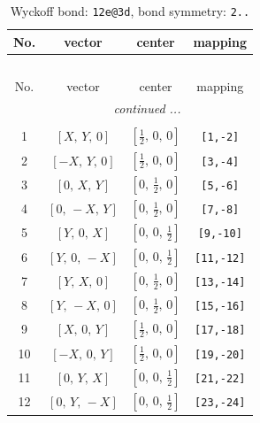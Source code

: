 \documentclass[fleqn,8pt]{jsarticle}
\begin{document}
\renewcommand{\arraystretch}{1.2}
\begin{longtable}{cccc}
\caption{Wyckoff bond: {\tt 12e@3d}, bond symmetry: {\tt 2..}}
 \\
 \hline \hline
No. & vector & center & mapping \\ \hline \endfirsthead

\multicolumn{3}{l}{\tablename\ \thetable{}} \\
 \hline \hline
No. & vector & center & mapping \\ \hline \endhead

 \hline \hline
\multicolumn{3}{r}{\footnotesize\it continued ...} \\ \endfoot

 \hline \hline
\multicolumn{3}{r}{} \\ \endlastfoot

1 & $\left[ X,\, Y,\, 0 \right]$ & $\left[ \frac{1}{2},\, 0,\, 0 \right]$ & {\tt [1,-2]} \\ \hline
2 & $\left[ - X,\, Y,\, 0 \right]$ & $\left[ \frac{1}{2},\, 0,\, 0 \right]$ & {\tt [3,-4]} \\ \hline
3 & $\left[ 0,\, X,\, Y \right]$ & $\left[ 0,\, \frac{1}{2},\, 0 \right]$ & {\tt [5,-6]} \\ \hline
4 & $\left[ 0,\, - X,\, Y \right]$ & $\left[ 0,\, \frac{1}{2},\, 0 \right]$ & {\tt [7,-8]} \\ \hline
5 & $\left[ Y,\, 0,\, X \right]$ & $\left[ 0,\, 0,\, \frac{1}{2} \right]$ & {\tt [9,-10]} \\ \hline
6 & $\left[ Y,\, 0,\, - X \right]$ & $\left[ 0,\, 0,\, \frac{1}{2} \right]$ & {\tt [11,-12]} \\ \hline
7 & $\left[ Y,\, X,\, 0 \right]$ & $\left[ 0,\, \frac{1}{2},\, 0 \right]$ & {\tt [13,-14]} \\ \hline
8 & $\left[ Y,\, - X,\, 0 \right]$ & $\left[ 0,\, \frac{1}{2},\, 0 \right]$ & {\tt [15,-16]} \\ \hline
9 & $\left[ X,\, 0,\, Y \right]$ & $\left[ \frac{1}{2},\, 0,\, 0 \right]$ & {\tt [17,-18]} \\ \hline
10 & $\left[ - X,\, 0,\, Y \right]$ & $\left[ \frac{1}{2},\, 0,\, 0 \right]$ & {\tt [19,-20]} \\ \hline
11 & $\left[ 0,\, Y,\, X \right]$ & $\left[ 0,\, 0,\, \frac{1}{2} \right]$ & {\tt [21,-22]} \\ \hline
12 & $\left[ 0,\, Y,\, - X \right]$ & $\left[ 0,\, 0,\, \frac{1}{2} \right]$ & {\tt [23,-24]} \\
\end{longtable}
\end{document}
